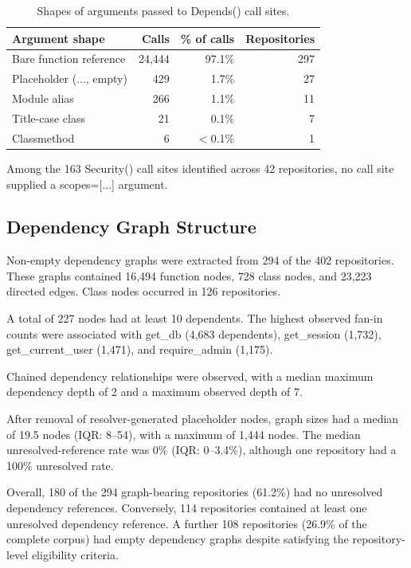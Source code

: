 \begin{table}[!t]
\centering
\caption{Shapes of arguments passed to Depends() call sites.}
\label{tab:shapes}
\begin{tabular}{@{}lrrr@{}}
\toprule
\textbf{Argument shape} & \textbf{Calls} & \textbf{\% of calls} & \textbf{Repositories} \\
\midrule
Bare function reference & 24,444 & 97.1\% & 297 \\
Placeholder (..., empty) & 429 & 1.7\% & 27 \\
Module alias & 266 & 1.1\% & 11 \\
Title-case class & 21 & 0.1\% & 7 \\
Classmethod & 6 & $<$0.1\% & 1 \\
\bottomrule
\end{tabular}
\end{table}

Among the 163 Security() call sites identified across 42 repositories, no call site supplied a scopes=[...] argument.

\subsection{Dependency Graph Structure}

Non-empty dependency graphs were extracted from 294 of the 402 repositories. These graphs contained 16,494 function nodes, 728 class nodes, and 23,223 directed edges. Class nodes occurred in 126 repositories.

A total of 227 nodes had at least 10 dependents. The highest observed fan-in counts were associated with get\_db (4,683 dependents), get\_session (1,732), get\_current\_user (1,471), and require\_admin (1,175).

Chained dependency relationships were observed, with a median maximum dependency depth of 2 and a maximum observed depth of 7.

After removal of resolver-generated placeholder nodes, graph sizes had a median of 19.5 nodes (IQR: 8--54), with a maximum of 1,444 nodes. The median unresolved-reference rate was 0\% (IQR: 0--3.4\%), although one repository had a 100\% unresolved rate.

Overall, 180 of the 294 graph-bearing repositories (61.2\%) had no unresolved dependency references. Conversely, 114 repositories contained at least one unresolved dependency reference. A further 108 repositories (26.9\% of the complete corpus) had empty dependency graphs despite satisfying the repository-level eligibility criteria.

